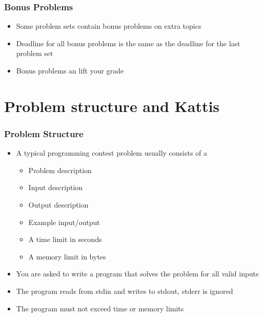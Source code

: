 \documentclass{beamer}
\begin{document}
\begin{frame}[plain]
	\frametitle{Bonus Problems}
	\begin{itemize}
		\item Some problem sets contain bonus problems on extra topics
        \item Deadline for all bonus problems is the same as the deadline for the last problem set
        \item Bonus problems an lift your grade
	\end{itemize}
\end{frame}


\section*{Problem structure and Kattis}

\begin{frame}[plain]
	\frametitle{Problem Structure}
	\begin{itemize}
		\item A typical programming contest problem usually consists of a
        \begin{itemize} 
            \item Problem description
            \item Input description
            \item Output description
            \item Example input/output
            \item A time limit in seconds
            \item A memory limit in bytes
        \end{itemize}
        \item You are asked to write a program that solves the problem for all valid inputs
        \item The program reads from stdin and writes to stdout, stderr is ignored
        \item The program must not exceed time or memory limits
	\end{itemize}
\end{frame}
\end{document}
